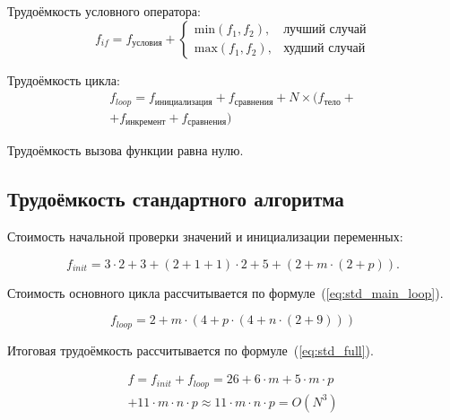 Трудоёмкость условного оператора:
\begin{equation}
    f_{if} = f_{\text{условия}} + 
    \begin{cases}
        \text{min}(f_1, f_2), & \text{лучший случай}\\
        \text{max}(f_1, f_2), & \text{худший случай}
    \end{cases}
\end{equation}

Трудоёмкость цикла:
\begin{equation}
    \begin{gathered}
        f_{loop} = f_{\text{инициализация}} + f_{\text{сравнения}} + N \times (f_{\text{тело}} +\\
        + f_{\text{инкремент}} + f_{\text{сравнения}})
    \end{gathered}
\end{equation}

Трудоёмкость вызова функции равна нулю.

\subsection{Трудоёмкость стандартного алгоритма}

Стоимость начальной проверки значений и инициализации переменных:

\begin{equation}
    \label{eq:std_init}
    f_{init} = 3 \cdot 2 + 3 + (2 + 1 + 1) \cdot 2 + 5 + (2 + m \cdot (2 + p)). 
\end{equation}

Стоимость основного цикла рассчитывается по формуле~(\ref{eq:std_main_loop}).

\begin{equation}
    \label{eq:std_main_loop}
    f_{loop} = 2 + m \cdot(4 + p \cdot (4 + n \cdot (2 + 9)))
\end{equation}

Итоговая трудоёмкость рассчитывается по формуле~(\ref{eq:std_full}).

\begin{equation}
    \label{eq:std_full}
    \begin{gathered}
        f = f_{init} + f_{loop} = 26 + 6\cdot m + 5 \cdot m \cdot p \\
        + 11 \cdot m \cdot n \cdot p \approx 11 \cdot m \cdot n \cdot p = O(N^3)
    \end{gathered}
\end{equation}

